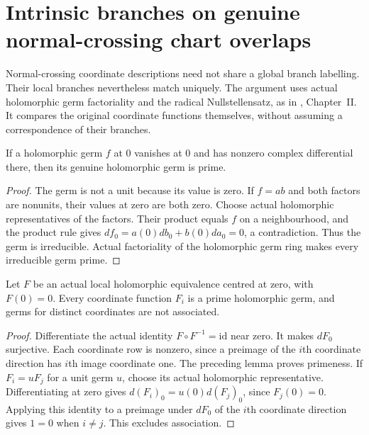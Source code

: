 \section{Intrinsic branches on genuine normal-crossing chart overlaps}

Normal-crossing coordinate descriptions need not share a global branch
labelling. Their local branches nevertheless match uniquely. The argument
uses actual holomorphic germ factoriality and the radical Nullstellensatz,
as in \cite{demailly-cadg}, Chapter~II. It compares the original coordinate
functions themselves, without assuming a correspondence of their branches.

\begin{lemma}
\label{hir:first-order-equation-prime}
\leanok
If a holomorphic germ $f$ at $0$ vanishes at $0$ and has nonzero complex
differential there, then its genuine holomorphic germ is prime.
\end{lemma}
\begin{proof}
The germ is not a unit because its value is zero. If $f=ab$ and both
factors are nonunits, their values at zero are both zero. Choose actual
holomorphic representatives of the factors. Their product equals $f$ on
a neighbourhood, and the product rule gives $df_0=a(0)db_0+b(0)da_0=0$,
a contradiction. Thus the germ is irreducible. Actual factoriality of
the holomorphic germ ring makes every irreducible germ prime.
\end{proof}

\begin{lemma}
\label{hir:actual-coordinate-distinct-prime-branches}
\leanok
Let $F$ be an actual local holomorphic equivalence centred at zero, with
$F(0)=0$. Every coordinate function $F_i$ is a prime holomorphic germ,
and germs for distinct coordinates are not associated.
\end{lemma}
\begin{proof}
Differentiate the actual identity $F\circ F^{-1}=\mathrm{id}$ near zero.
It makes $dF_0$ surjective. Each coordinate row is nonzero, since a
preimage of the $i$th coordinate direction has $i$th image coordinate
one. The preceding lemma proves primeness. If $F_i=uF_j$ for a unit
germ $u$, choose its actual holomorphic representative. Differentiating
at zero gives $d(F_i)_0=u(0)d(F_j)_0$, since $F_j(0)=0$. Applying this
identity to a preimage under $dF_0$ of the $i$th coordinate direction
gives $1=0$ when $i\ne j$. This excludes association.
\end{proof}

